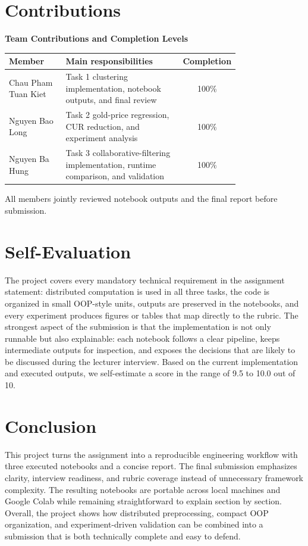 \documentclass[conference]{IEEEtran}
\begin{document}
\section{Contributions}
\begin{center}
\scriptsize
\textbf{Team Contributions and Completion Levels}\\[2pt]
\setlength{\tabcolsep}{3pt}
\begin{tabular}{>{\raggedright\arraybackslash}p{0.25\linewidth}>{\raggedright\arraybackslash}p{0.52\linewidth}c}
\toprule
Member & Main responsibilities & Completion \\
\midrule
Chau Pham Tuan Kiet & Task 1 clustering implementation, notebook outputs, and final review & 100\% \\
Nguyen Bao Long & Task 2 gold-price regression, CUR reduction, and experiment analysis & 100\% \\
Nguyen Ba Hung & Task 3 collaborative-filtering implementation, runtime comparison, and validation & 100\% \\
\bottomrule
\end{tabular}
\end{center}
All members jointly reviewed notebook outputs and the final report before submission.

\section{Self-Evaluation}
The project covers every mandatory technical requirement in the assignment statement: distributed computation is used in all three tasks, the code is organized in small OOP-style units, outputs are preserved in the notebooks, and every experiment produces figures or tables that map directly to the rubric. 
The strongest aspect of the submission is that the implementation is not only runnable but also explainable: each notebook follows a clear pipeline, keeps intermediate outputs for inspection, and exposes the decisions that are likely to be discussed during the lecturer interview. 
Based on the current implementation and executed outputs, we self-estimate a score in the range of 9.5 to 10.0 out of 10.

\section{Conclusion}
This project turns the assignment into a reproducible engineering workflow with three executed notebooks and a concise report. 
The final submission emphasizes clarity, interview readiness, and rubric coverage instead of unnecessary framework complexity. 
The resulting notebooks are portable across local machines and Google Colab while remaining straightforward to explain section by section. 
Overall, the project shows how distributed preprocessing, compact OOP organization, and experiment-driven validation can be combined into a submission that is both technically complete and easy to defend.



\end{document}
